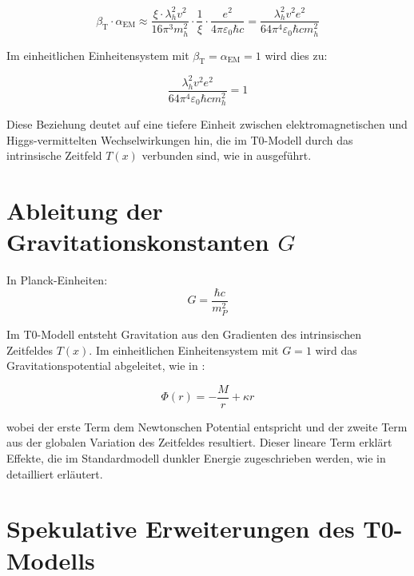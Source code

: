 \documentclass[12pt,a4paper]{article}
\newcommand{\Tfield}{T(x)}
\newcommand{\betaT}{\beta_{\text{T}}}
\newcommand{\alphaEM}{\alpha_{\text{EM}}}
\begin{document}
	\begin{equation}
		\betaT \cdot \alphaEM \approx \frac{\xi \cdot \lambda_h^2 v^2}{16\pi^3 m_h^2} \cdot \frac{1}{\xi} \cdot \frac{e^2}{4\pi\varepsilon_0\hbar c} = \frac{\lambda_h^2 v^2 e^2}{64\pi^4\varepsilon_0\hbar c m_h^2}
	\end{equation}
	
	Im einheitlichen Einheitensystem mit \(\betaT = \alphaEM = 1\) wird dies zu:
	
	\begin{equation}
		\frac{\lambda_h^2 v^2 e^2}{64\pi^4\varepsilon_0\hbar c m_h^2} = 1
	\end{equation}
	
	Diese Beziehung deutet auf eine tiefere Einheit zwischen elektromagnetischen und Higgs-vermittelten Wechselwirkungen hin, die im T0-Modell durch das intrinsische Zeitfeld \(\Tfield\) verbunden sind, wie in \cite{pascher_higgs_2025} ausgeführt.
	
	\section{Ableitung der Gravitationskonstanten \(G\)}
	\label{sec:gravitational_constant}
	
	In Planck-Einheiten:
	\begin{equation}
		G = \frac{\hbar c}{m_P^2}
	\end{equation}
	
	Im T0-Modell entsteht Gravitation aus den Gradienten des intrinsischen Zeitfeldes \(\Tfield\). Im einheitlichen Einheitensystem mit \(G = 1\) wird das Gravitationspotential abgeleitet, wie in \cite{pascher_emergente_gravitation_2025}:
	
	\begin{equation}
		\label{eq:grav_potential}
		\Phi(r) = -\frac{M}{r} + \kappa r
	\end{equation}
	
	wobei der erste Term dem Newtonschen Potential entspricht und der zweite Term aus der globalen Variation des Zeitfeldes resultiert. Dieser lineare Term erklärt Effekte, die im Standardmodell dunkler Energie zugeschrieben werden, wie in \cite{pascher_galaxies_2025} detailliert erläutert.
	
	\section{Spekulative Erweiterungen des T0-Modells}
	\label{sec:speculative}
	
\end{document}
